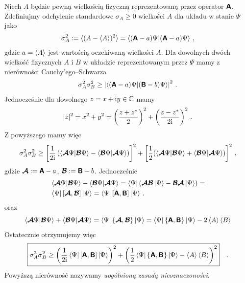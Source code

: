 \documentclass{myclass}
\begin{document}
Niech \(A\) będzie pewną wielkością fizyczną reprezentowaną przez operator \(\boldsymbol{\mathsf{A}}\). Zdefiniujmy
odchylenie standardowe \(\sigma_A \geq 0\) wielkości \(A\) dla układu w stanie \(\Psi\) jako
\begin{equation*}
    \sigma_A^2 := \langle (A - \langle A \rangle)^2 \rangle = \braket{(\boldsymbol{\mathsf{A}}-a)\Psi}{(\boldsymbol{\mathsf{A}}-a)\Psi}\,,
\end{equation*}
gdzie \(a = \expval{A}\) jest wartością oczekiwaną wielkości \(A\). Dla dowolnych dwóch wielkość
fizycznych \(A\) i \(B\) w układzie reprezentowanym przez \(\Psi\) mamy z nierówności
Cauchy'ego--Schwarza
\begin{equation*}
    \sigma_A^2\sigma_B^2 \geq \left|\braket{(\boldsymbol{\mathsf{A}}-a)\Psi}{(\boldsymbol{\mathsf{B}}-b)\Psi}\right|^2\,.
\end{equation*}
Jednocześnie dla dowolnego \(z = x + \mathrm{i} y \in\mathbb{C}\) mamy
\begin{equation*}
    |z|^2 = x^2 + y^2 = \left(\frac{z + z^*}{2}\right)^2 + \left(\frac{z-z^*}{2\mathrm{i}}\right)^2\,.
\end{equation*}
Z powyższego mamy więc
\begin{equation*}
    \sigma_A^2\sigma_B^2 \geq \left[\frac{1}{2\mathrm{i}}\left(\braket{\boldsymbol{\mathsf{\mathcal{A}}}\Psi}{\boldsymbol{\mathsf{\mathcal{B}}}\Psi} - \braket{\boldsymbol{\mathsf{\mathcal{B}}}\Psi}{\boldsymbol{\mathsf{\mathcal{A}}}\Psi}\right)\right]^2 + \left[\frac{1}{2}(\braket{\boldsymbol{\mathsf{\mathcal{A}}}\Psi}{\boldsymbol{\mathsf{\mathcal{B}}}\Psi} + \braket{\boldsymbol{\mathsf{\mathcal{B}}}\Psi}{\boldsymbol{\mathsf{\mathcal{A}}}\Psi})\right]^2\,,
\end{equation*}
gdzie \(\boldsymbol{\mathsf{\mathcal{A}}} := \boldsymbol{\mathsf{A}} - a\), \(\boldsymbol{\mathsf{\mathcal{B}}} := \boldsymbol{\mathsf{B}} - b\). Jednocześnie
\begin{equation*}
    \begin{split}
        &\braket{\boldsymbol{\mathsf{\mathcal{A}}}\Psi}{\boldsymbol{\mathsf{\mathcal{B}}}\Psi} - \braket{\boldsymbol{\mathsf{\mathcal{B}}}\Psi}{\boldsymbol{\mathsf{\mathcal{A}}}\Psi} =
        \bra{\Psi}(\boldsymbol{\mathsf{\mathcal{A}}}\boldsymbol{\mathsf{\mathcal{B}}}\ket{\Psi}-\boldsymbol{\mathsf{\mathcal{B}}}\boldsymbol{\mathsf{\mathcal{A}}}\ket{\Psi})=\\
        &\bra{\Psi}[\boldsymbol{\mathsf{\mathcal{A}}},\boldsymbol{\mathsf{\mathcal{B}}}]\ket{\Psi} = \bra{\Psi}[\boldsymbol{\mathsf{A}},\boldsymbol{\mathsf{B}}]\ket{\Psi}\,.
    \end{split}
\end{equation*}
oraz
\begin{equation*}
    \braket{\boldsymbol{\mathsf{\mathcal{A}}}\Psi}{\boldsymbol{\mathsf{\mathcal{B}}}\Psi} + \braket{\boldsymbol{\mathsf{\mathcal{B}}}\Psi}{\boldsymbol{\mathsf{\mathcal{A}}}\Psi} = \bra{\Psi}\{\boldsymbol{\mathsf{\mathcal{A}}},\boldsymbol{\mathsf{\mathcal{B}}}\}\ket{\Psi} = \bra{\Psi}\{\boldsymbol{\mathsf{A}},\boldsymbol{\mathsf{B}}\}\ket{\Psi} - 2\expval{A}\expval{B}
\end{equation*}
Ostatecznie otrzymujemy więc
\begin{equation*}
    \boxed{
    \sigma_A^2\sigma_B^2 \geq \left(\frac{1}{2\mathrm{i}}\bra{\Psi}[\boldsymbol{\mathsf{A}},\boldsymbol{\mathsf{B}}]\ket{\Psi}\right)^2 + \left(\frac{1}{2}\bra{\Psi}\{\boldsymbol{\mathsf{A}},\boldsymbol{\mathsf{B}}\}\ket{\Psi} - \expval{A}\expval{B}\right)^2
    }\quad.
\end{equation*}
Powyższą nierówność nazywamy \textit{uogólnioną zasadą nieoznaczoności}.
\end{document}
